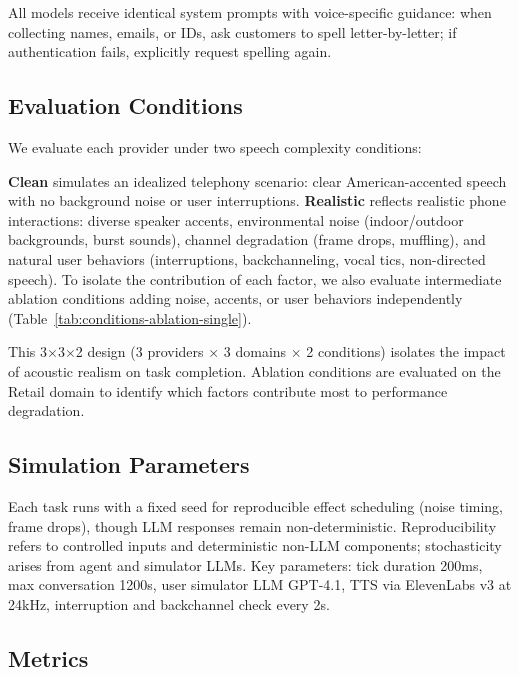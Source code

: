 All models receive identical system prompts with voice-specific guidance: when collecting names, emails, or IDs, ask customers to spell letter-by-letter; if authentication fails, explicitly request spelling again.

\subsection{Evaluation Conditions}

We evaluate each provider under two speech complexity conditions:



\textbf{Clean} simulates an idealized telephony scenario: clear American-accented speech with no background noise or user interruptions. \textbf{Realistic} reflects realistic phone interactions: diverse speaker accents, environmental noise (indoor/outdoor backgrounds, burst sounds), channel degradation (frame drops, muffling), and natural user behaviors (interruptions, backchanneling, vocal tics, non-directed speech). To isolate the contribution of each factor, we also evaluate intermediate ablation conditions adding noise, accents, or user behaviors independently (Table~\ref{tab:conditions-ablation-single}).



This 3$\times$3$\times$2 design (3 providers $\times$ 3 domains $\times$ 2 conditions) isolates the impact of acoustic realism on task completion. Ablation conditions are evaluated on the Retail domain to identify which factors contribute most to performance degradation.

\subsection{Simulation Parameters}

Each task runs with a fixed seed for reproducible effect scheduling (noise timing, frame drops), though LLM responses remain non-deterministic. Reproducibility refers to controlled inputs and deterministic non-LLM components; stochasticity arises from agent and simulator LLMs. Key parameters: tick duration 200ms, max conversation 1200s, user simulator LLM GPT-4.1, TTS via ElevenLabs v3 at 24kHz, interruption and backchannel check every 2s.

\subsection{Metrics}

